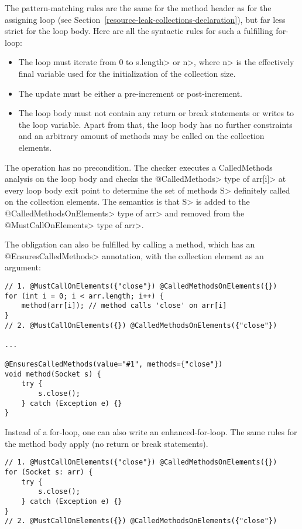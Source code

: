 The pattern-matching rules are the same for the method header as for the assigning loop (see Section~\ref{resource-leak-collections-declaration}), but far less strict for the loop body. Here are all the syntactic rules for such a fulfilling for-loop:
\begin{itemize}
  \item The loop must iterate from 0 to \<s.length> or \<n>, where \<n> is the effectively final variable used for the initialization of the collection size.
  \item The update must be either a pre-increment or post-increment.
  \item The loop body must not contain any return or break statements or writes to the loop variable. Apart from that, the loop body has no further constraints and an arbitrary amount of methods may be called on the collection elements.
\end{itemize}
The operation has no precondition. The checker executes a CalledMethods analysis on the loop body and checks the \<@CalledMethods> type of \<arr[i]> at every loop body exit point to determine the set of methods \<S> definitely called on the collection elements. The semantics is that \<S> is added to the \<@CalledMethodsOnElements> type of \<arr> and removed from the \<@MustCallOnElements> type of \<arr>.

The obligation can also be fulfilled by calling a method, which has an \<@EnsuresCalledMethods> annotation, with the collection element as an argument:
\begin{verbatim}
// 1. @MustCallOnElements({"close"}) @CalledMethodsOnElements({})
for (int i = 0; i < arr.length; i++) {
    method(arr[i]); // method calls 'close' on arr[i]
}
// 2. @MustCallOnElements({}) @CalledMethodsOnElements({"close"})

...

@EnsuresCalledMethods(value="#1", methods={"close"})
void method(Socket s) {
    try {
        s.close();
    } catch (Exception e) {}
}
\end{verbatim}

Instead of a for-loop, one can also write an enhanced-for-loop. The same rules for the method body apply (no return or break statements).
\begin{verbatim}
// 1. @MustCallOnElements({"close"}) @CalledMethodsOnElements({})
for (Socket s: arr) {
    try {
        s.close();
    } catch (Exception e) {}
}
// 2. @MustCallOnElements({}) @CalledMethodsOnElements({"close"})
\end{verbatim}

